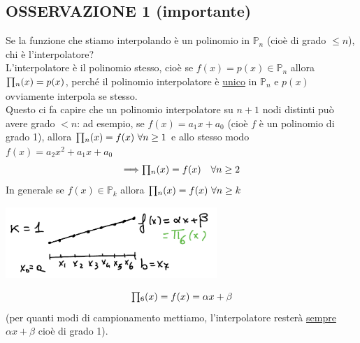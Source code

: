 \subsection{OSSERVAZIONE 1 (importante)}
Se la funzione che stiamo interpolando è un polinomio in $\mathbb{P}_n$ (cioè di grado $\leq n$), chi è l'interpolatore?\\
L'interpolatore è il polinomio stesso, cioè se $f(x) = p(x) \in \mathbb{P}_n$ allora $\begin{matrix}\prod\end{matrix}_n(x) = p(x)$, perché il polinomio interpolatore è \uline{unico} in $\mathbb{P}_n$ e
$p(x)$ ovviamente interpola se stesso.\\
Questo ci fa capire che un polinomio interpolatore su $n+1$ nodi distinti può avere grado $<n$: ad esempio, se $f(x) = a_1x + a_0$ (cioè $f$ è un polinomio di grado 1), allora $\begin{matrix}\prod\end{matrix}_n(x) = f(x) \ \forall n \ge 1$ e allo stesso modo $f(x) = a_2x^2 + a_1x + a_0$
\[\Longrightarrow \begin{matrix}\prod\end{matrix}_n(x) = f(x) \quad \forall n \ge 2\]
In generale se $f(x) \in \mathbb{P}_k$ allora $\begin{matrix}\prod\end{matrix}_n(x) = f(x) \ \forall n \ge k$
\begin{center}
    \includegraphics[width=0.6\textwidth]{foto/lez12_img2}
\end{center}
\[\begin{matrix}\prod\end{matrix}_6(x) = f(x) = \alpha x + \beta\]
(per quanti modi di campionamento mettiamo, l'interpolatore resterà \uline{sempre} $\alpha x + \beta$ cioè di grado 1).

